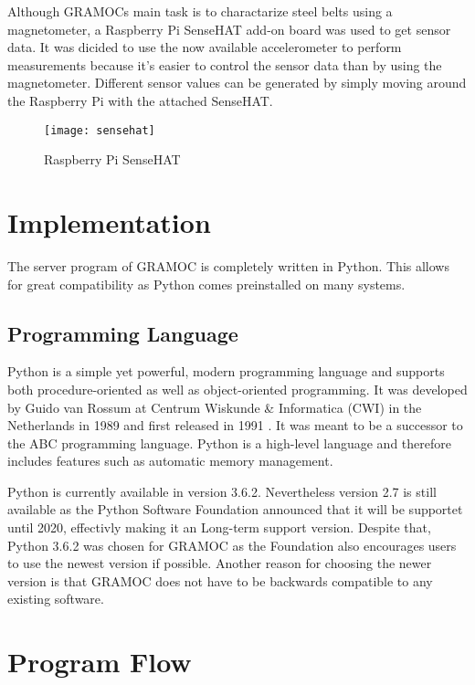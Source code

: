 Although GRAMOCs main task is to charactarize steel belts using a magnetometer, a Raspberry Pi SenseHAT add-on board was used to get sensor data. It was dicided to use the now available accelerometer to perform measurements because it's easier to control the sensor data than by using the magnetometer. Different sensor values can be generated by simply moving around the Raspberry Pi with the attached SenseHAT.

\begin{figure}[H]
	\centering
	\texttt{[image: sensehat]}
	\caption{Raspberry Pi SenseHAT \cite{img:sensehat}}
	\label{fig:sensehat}
\end{figure}

\section{Implementation}

The server program of GRAMOC is completely written in Python. This allows for great compatibility as Python comes preinstalled on many systems.

\subsection{Programming Language}

Python is a simple yet powerful, modern programming language and supports both procedure-oriented as well as object-oriented programming. It was developed by Guido van Rossum at Centrum Wiskunde \& Informatica (CWI) in the Netherlands in 1989 and first released in 1991 \cite{HistoryOfPython}. It was meant to be a successor to the ABC programming language. Python is a high-level language and therefore includes features such as automatic memory management.

Python is currently available in version 3.6.2. Nevertheless version 2.7 is still available as the Python Software Foundation announced that it will be supportet until 2020, effectivly making it an Long-term support version. Despite that, Python 3.6.2 was chosen for GRAMOC as the Foundation also encourages users to use the newest version if possible. Another reason for choosing the newer version is that GRAMOC does not have to be backwards compatible to any existing software.

\section{Program Flow}

